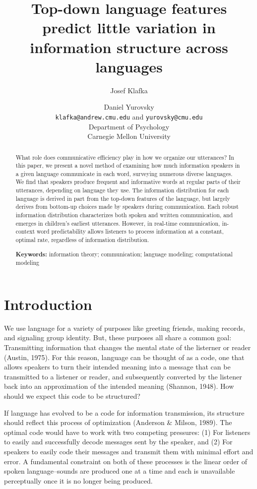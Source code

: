 \documentclass[10pt, letterpaper]{article}
\title{Top-down language features predict little variation in information
structure across languages}
\author{Josef Klafka \and Daniel Yurovsky \\
        \texttt{klafka@andrew.cmu.edu} and \texttt{yurovsky@cmu.edu} \\
       Department of Psychology \\ Carnegie Mellon University}
\begin{document}
\maketitle

\begin{abstract}
What role does communicative efficiency play in how we organize our
utterances? In this paper, we present a novel method of examining how
much information speakers in a given language communicate in each word,
surveying numerous diverse languages. We find that speakers produce
frequent and informative words at regular parts of their utterances,
depending on language they use. The information distribution for each
language is derived in part from the top-down features of the language,
but largely derives from bottom-up choices made by speakers during
communication. Each robust information distribution characterizes both
spoken and written communication, and emerges in children's earliest
utterances. However, in real-time communication, in-context word
predictability allows listeners to process information at a constant,
optimal rate, regardless of information distribution.

\textbf{Keywords:}
information theory; communication; language modeling; computational
modeling
\end{abstract}

\hypertarget{introduction}{%
\section{Introduction}\label{introduction}}

We use language for a variety of purposes like greeting friends, making
records, and signaling group identity. But, these purposes all share a
common goal: Transmitting information that changes the mental state of
the listerner or reader (Austin, 1975). For this reason, language can be
thought of as a code, one that allows speakers to turn their intended
meaning into a message that can be transmitted to a listener or reader,
and subsequently converted by the listener back into an approximation of
the intended meaning (Shannon, 1948). How should we expect this code to
be structured?

If language has evolved to be a code for information transmission, its
structure should reflect this process of optimization (Anderson \&
Milson, 1989). The optimal code would have to work with two competing
pressures: (1) For listeners to easily and successfully decode messages
sent by the speaker, and (2) For speakers to easily code their messages
and transmit them with minimal effort and error. A fundamental
constraint on both of these processes is the linear order of spoken
language--sounds are produced one at a time and each is unavailable
perceptually once it is no longer being produced.
\end{document}

